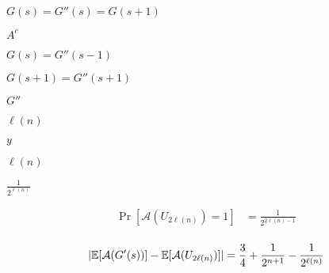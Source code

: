 \documentclass[10pt]{book}
\begin{document}
\begin{mdSnippets}
\begin{mdInlineSnippet}[3b8829e3388d5b9a3de2466c8cca55a5]%
$G(s) = G''(s) = G(s + 1)$\end{mdInlineSnippet}%
\begin{mdInlineSnippet}[c8b8ab01c14744d05d2c4325fefcb77c]%
$A^c$\end{mdInlineSnippet}%
\begin{mdInlineSnippet}%
$G(s) = G''(s-1)$\end{mdInlineSnippet}%
\begin{mdInlineSnippet}[5af3f8762f92d6b890679bd5fa67e137]%
$G(s+1) = G''(s+1)$\end{mdInlineSnippet}%
\begin{mdInlineSnippet}[6605946909b77db5a5b36d9bdde73d35]%
$G''$\end{mdInlineSnippet}%
\begin{mdInlineSnippet}%
$\ell(n)$\end{mdInlineSnippet}%
\begin{mdInlineSnippet}[415290769594460e2e485922904f345d]%
$y$\end{mdInlineSnippet}%
\begin{mdInlineSnippet}%
$\ell(n)$\end{mdInlineSnippet}%
\begin{mdInlineSnippet}[f7af357eb0c027e16a75b47361ad63e3]%
$\frac{1}{2^{\ell(n)}}$\end{mdInlineSnippet}%
\begin{mdDisplaySnippet}[11ae15967598671dc8c100c64c2d1541]%
\[%
\begin{aligned}
 \Pr[\mathcal{A}(U_{2\ell(n)}) = 1] &= \frac{1}{2^{2\ell(n) - 1}} \\
\end{aligned} 
\]%
\end{mdDisplaySnippet}%
\begin{mdDisplaySnippet}%
\[%
|\E[\mathcal{A}(G'(s))] - \E[\mathcal{A}(U_{2\ell(n)})]| = \frac{3}{4} + \frac{1}{2^{n+1}} - \frac{1}{2^{\ell(n)}} 
\]%
\end{mdDisplaySnippet}%

\end{mdSnippets}
\end{document}
